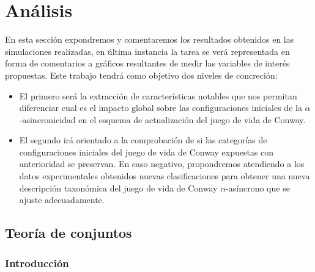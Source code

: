 \documentclass[../proyecto.tex]{memoir}
\begin{document}
\chapter{Análisis}

En esta sección expondremos y comentaremos los resultados obtenidos en las simulaciones realizadas, en última instancia la tarea se verá representada en forma de comentarios a  gráficos resultantes de medir las variables de interés propuestas. Este trabajo tendrá como objetivo dos niveles de concreción:

\begin{itemize}
\item El primero será la extracción de características notables que nos permitan diferenciar cual es el impacto global sobre las configuraciones iniciales de la $\alpha$-asincronicidad en el esquema de actualización del juego de vida de Conway. 

\item El segundo irá orientado a la comprobación de si las categorías de configuraciones iniciales del juego de vida de Conway expuestas con anterioridad se preservan. En caso negativo, propondremos atendiendo a los datos experimentales obtenidos nuevas clasificaciones para obtener una nueva descripción taxonómica del juego de vida de Conway $\alpha$-asíncrono que se ajuste adecuadamente.
\end{itemize}


\section{Teoría de conjuntos}

\subsection{Introducción}
\end{document}
